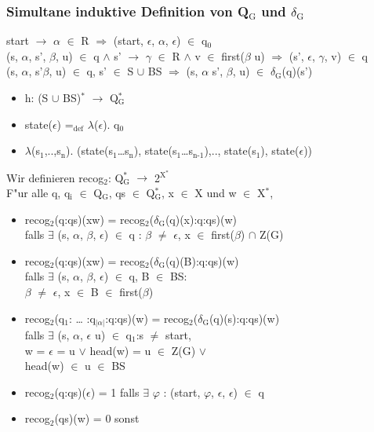 \documentclass[11pt]{article}
\begin{document}
\subsubsection{Simultane induktive Definition von Q$_{\text{G}}$ und $\delta$$_{\text{G}}$}
\label{sec-7-2-1}
\begin{center}
start $\to$ $\alpha$ $\in$ R $\Rightarrow$ (start, $\epsilon$, $\alpha$, $\epsilon$) $\in$ q$_{\text{0}}$ \\
(s, $\alpha$, s', $\beta$, u) $\in$ q $\land$ s' $\to$ $\gamma$ $\in$ R $\land$ v $\in$ first($\beta$ u) $\Rightarrow$ (s', $\epsilon$, $\gamma$, v) $\in$ q \\
(s, $\alpha$, s'$\beta$, u) $\in$ q, s' $\in$ S $\cup$ BS $\Rightarrow$ (s, $\alpha$ s', $\beta$, u) $\in$ $\delta$$_{\text{G}}$(q)(s')
\end{center}

\begin{itemize}
\item h: (S $\cup$ BS)$^{\text{*}}$ $\to$ Q$^{\text{*}}_{\text{G}}$
\item state($\epsilon$) =$_{\text{def}}$ $\lambda$($\epsilon$). q$_{\text{0}}$
\item $\lambda$(s$_{\text{1}}$,..,s$_{\text{n}}$). (state(s$_{\text{1}}$\ldots{}s$_{\text{n}}$), state(s$_{\text{1}}$\ldots{}s$_{\text{n-1}}$),.., state(s$_{\text{1}}$), state($\epsilon$))
\end{itemize}


Wir definieren recog$_{\text{2}}$: Q$^{\text{*}}_{\text{G}}$ $\to$ 2$^{\text{X}^{\text{*}}}$ \\
F"ur alle q, q$_{\text{i}}$ $\in$ Q$_{\text{G}}$, qs $\in$ Q$^{\text{*}}_{\text{G}}$, x $\in$ X und w $\in$ X$^{\text{*}}$,
\begin{itemize}
\item recog$_{\text{2}}$(q:qs)(xw) = recog$_{\text{2}}$($\delta$$_{\text{G}}$(q)(x):q:qs)(w) \\ falls $\exists$ (s, $\alpha$, $\beta$, $\epsilon$) $\in$ q : $\beta$ $\neq$ $\epsilon$, x $\in$ first($\beta$) $\cap$ Z(G)
\item recog$_{\text{2}}$(q:qs)(xw) = recog$_{\text{2}}$($\delta$$_{\text{G}}$(q)(B):q:qs)(w) \\ falls $\exists$ (s, $\alpha$, $\beta$, $\epsilon$) $\in$ q, B $\in$ BS: \\ $\beta$ $\neq$ $\epsilon$, x $\in$ B $\in$ first($\beta$)
\item recog$_{\text{2}}$(q$_{\text{1}}$: \ldots{} :q$_{\text{|}\alpha\text{|}}$:q:qs)(w) = recog$_{\text{2}}$($\delta$$_{\text{G}}$(q)(s):q:qs)(w) \\ falls $\exists$ (s, $\alpha$, $\epsilon$ u) $\in$ q$_{\text{1}}$:s $\neq$ start, \\ w = $\epsilon$ = u $\lor$ head(w) = u $\in$ Z(G) $\lor$ \\ head(w) $\in$ u $\in$ BS
\item recog$_{\text{2}}$(q:qs)($\epsilon$) = 1 falls $\exists$ $\varphi$ : (start, $\varphi$, $\epsilon$, $\epsilon$) $\in$ q
\item recog$_{\text{2}}$(qs)(w) = 0 sonst
\end{itemize}
\end{document}
